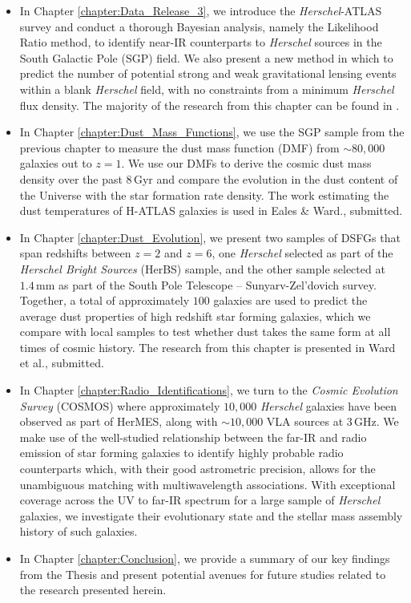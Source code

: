 \begin{itemize}
	\item In Chapter \ref{chapter:Data_Release_3}, we introduce the \textit{Herschel}-ATLAS survey and conduct a thorough Bayesian analysis, namely the Likelihood Ratio method, to identify near-IR counterparts to \textit{Herschel} sources in the South Galactic Pole (SGP) field. We also present a new method in which to predict the number of potential strong and weak gravitational lensing events within a blank \textit{Herschel} field, with no constraints from a minimum \textit{Herschel} flux density. The majority of the research from this chapter can be found in \citealt{Ward_2022}.
	\item In Chapter \ref{chapter:Dust_Mass_Functions}, we use the SGP sample from the previous chapter to measure the dust mass function (DMF) from $\sim80,000$ galaxies out to $z = 1$. We use our DMFs to derive the cosmic dust mass density over the past $8\,$Gyr and compare the evolution in the dust content of the Universe with the star formation rate density. The work estimating the dust temperatures of H-ATLAS galaxies is used in Eales \& Ward., submitted.
	\item In Chapter \ref{chapter:Dust_Evolution}, we present two samples of DSFGs that span redshifts between $z = 2$ and $z = 6$, one \textit{Herschel} selected as part of the \textit{Herschel Bright Sources} (HerBS) sample, and the other sample selected at $1.4\,$mm as part of the South Pole Telescope -- Sunyarv-Zel'dovich survey. Together, a total of approximately $100$ galaxies are used to predict the average dust properties of high redshift star forming galaxies, which we compare with local samples to test whether dust takes the same form at all times of cosmic history. The research from this chapter is presented in Ward et al., submitted.
	\item In Chapter \ref{chapter:Radio_Identifications}, we turn to the \textit{Cosmic Evolution Survey} (COSMOS) where approximately $10,000$ \textit{Herschel} galaxies have been observed as part of HerMES, along with $\sim10,000$ VLA sources at $3\,$GHz. We make use of the well-studied relationship between the far-IR and radio emission of star forming galaxies to identify highly probable radio counterparts which, with their good astrometric precision, allows for the unambiguous matching with multiwavelength associations. With exceptional coverage across the UV to far-IR spectrum for a large sample of \textit{Herschel} galaxies, we investigate their evolutionary state and the stellar mass assembly history of such galaxies.
	\item In Chapter \ref{chapter:Conclusion}, we provide a summary of our key findings from the Thesis and present potential avenues for future studies related to the research presented herein.
\end{itemize}

